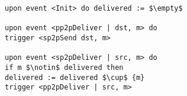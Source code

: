 \begin{lstlisting}[caption=Perfect links, mathescape, captionpos=b]
upon event <Init> do delivered := $\empty$

upon event <pp2pDeliver | dst, m> do
trigger <sp2pSend dst, m>

upon event <sp2pDeliver | src, m> do
if m $\notin$ delivered then
delivered := delivered $\cup$ {m}
trigger <pp2pDeliver | src, m>
\end{lstlisting}

